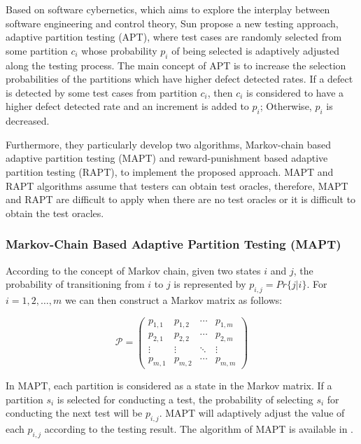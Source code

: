 \documentclass[10pt,journal,compsoc]{IEEEtran}
\begin{document}
Based on software cybernetics, which aims to explore the interplay between software engineering and control theory, Sun \cite{sun2018adaptive} propose a new testing approach, adaptive partition testing (APT), where test cases are randomly selected from some partition $c_i$ whose probability $p_i$ of being selected is adaptively adjusted along the testing process. The main concept of APT is to increase the selection probabilities of the partitions which have higher defect detected rates. If a defect is detected by some test cases from partition $c_i$, then $c_i$ is considered to have a higher defect detected rate and an increment is added to $p_i$; Otherwise, $p_i$ is decreased.

Furthermore, they particularly develop two algorithms, Markov-chain based adaptive partition testing (MAPT) and
reward-punishment based adaptive partition testing (RAPT), to implement the proposed approach. MAPT and RAPT algorithms assume that testers can obtain test oracles, therefore, MAPT and RAPT are difficult to apply when there are no test oracles or it is
difficult to obtain the test oracles. 

\subsubsection{Markov-Chain Based Adaptive Partition Testing (MAPT)}
\label{sec:mapt}

According to the concept of Markov chain, given two states $i$ and $j$, the probability of transitioning from $i$ to $j$ is represented by $p_{i,j} = Pr\{j|i\}$. For $i = 1, 2, \ldots, m$ we can then construct a Markov matrix as follows:

\begin{equation}
\label{eq:matrix}
\mathcal{P} =
\begin{pmatrix}{}
  p_{1,1} & p_{1,2} & \cdots & p_{1,m} \\
  p_{2,1} & p_{2,2} & \cdots & p_{2,m} \\
  \vdots  & \vdots  & \ddots & \vdots  \\
  p_{m,1} & p_{m,2} & \cdots & p_{m,m}
\end{pmatrix}
\end{equation}

In MAPT, each partition is considered as a state in the Markov matrix. If a partition $s_i$ is selected for conducting a
test, the probability of selecting $s_i$ for conducting the next test will be $p_{i,j}$. MAPT will adaptively adjust the value of
each $p_{i,j}$ according to the testing result. The algorithm of MAPT is available in \cite{sun2018adaptive}.
\end{document}
